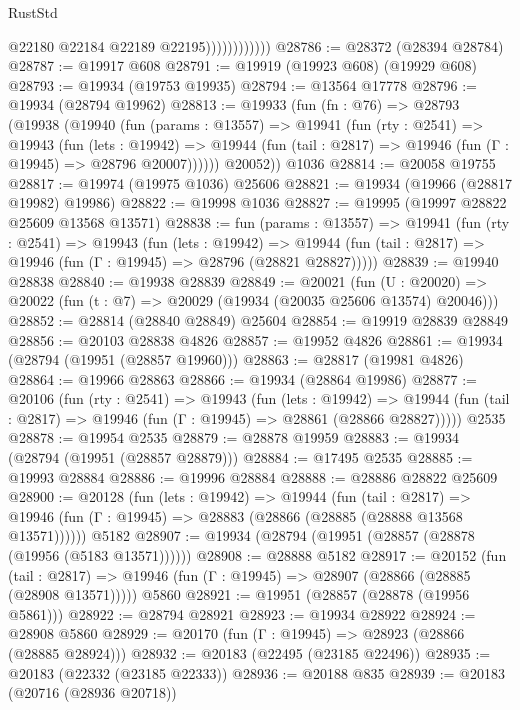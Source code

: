 \begin{lexlean}{RustStd}
\begin{coremodule}
                            @22180
                            @22184
                            @22189
                            @22195))))))))))))
@28786 := @28372 (@28394 @28784)
@28787 := @19917 @608
@28791 := @19919 (@19923 @608) (@19929 @608)
@28793 := @19934 (@19753 @19935)
@28794 := @13564 @17778
@28796 := @19934 (@28794 @19962)
@28813 := @19933
    (fun (fn : @76) =>
    @28793
      (@19938
        (@19940
          (fun (params : @13557) =>
          @19941
            (fun (rty : @2541) =>
            @19943
              (fun (lets : @19942) =>
              @19944 (fun (tail : @2817) => @19946 (fun (Γ : @19945) => @28796 @20007))))))
        @20052))
    @1036
@28814 := @20058 @19755
@28817 := @19974 (@19975 @1036) @25606
@28821 := @19934 (@19966 (@28817 @19982) @19986)
@28822 := @19998 @1036
@28827 := @19995 (@19997 @28822 @25609 @13568 @13571)
@28838 := fun (params : @13557) =>
  @19941
    (fun (rty : @2541) =>
    @19943
      (fun (lets : @19942) =>
      @19944 (fun (tail : @2817) => @19946 (fun (Γ : @19945) => @28796 (@28821 @28827)))))
@28839 := @19940 @28838
@28840 := @19938 @28839
@28849 := @20021
    (fun (U : @20020) => @20022 (fun (t : @7) => @20029 (@19934 (@20035 @25606 @13574) @20046)))
@28852 := @28814 (@28840 @28849) @25604
@28854 := @19919 @28839 @28849
@28856 := @20103 @28838 @4826
@28857 := @19952 @4826
@28861 := @19934 (@28794 (@19951 (@28857 @19960)))
@28863 := @28817 (@19981 @4826)
@28864 := @19966 @28863
@28866 := @19934 (@28864 @19986)
@28877 := @20106
    (fun (rty : @2541) =>
    @19943
      (fun (lets : @19942) =>
      @19944 (fun (tail : @2817) => @19946 (fun (Γ : @19945) => @28861 (@28866 @28827)))))
    @2535
@28878 := @19954 @2535
@28879 := @28878 @19959
@28883 := @19934 (@28794 (@19951 (@28857 @28879)))
@28884 := @17495 @2535
@28885 := @19993 @28884
@28886 := @19996 @28884
@28888 := @28886 @28822 @25609
@28900 := @20128
    (fun (lets : @19942) =>
    @19944
      (fun (tail : @2817) =>
      @19946 (fun (Γ : @19945) => @28883 (@28866 (@28885 (@28888 @13568 @13571))))))
    @5182
@28907 := @19934 (@28794 (@19951 (@28857 (@28878 (@19956 (@5183 @13571))))))
@28908 := @28888 @5182
@28917 := @20152
    (fun (tail : @2817) => @19946 (fun (Γ : @19945) => @28907 (@28866 (@28885 (@28908 @13571)))))
    @5860
@28921 := @19951 (@28857 (@28878 (@19956 @5861)))
@28922 := @28794 @28921
@28923 := @19934 @28922
@28924 := @28908 @5860
@28929 := @20170 (fun (Γ : @19945) => @28923 (@28866 (@28885 @28924)))
@28932 := @20183 (@22495 (@23185 @22496))
@28935 := @20183 (@22332 (@23185 @22333))
@28936 := @20188 @835
@28939 := @20183 (@20716 (@28936 @20718))

\end{coremodule}
\end{lexlean}
